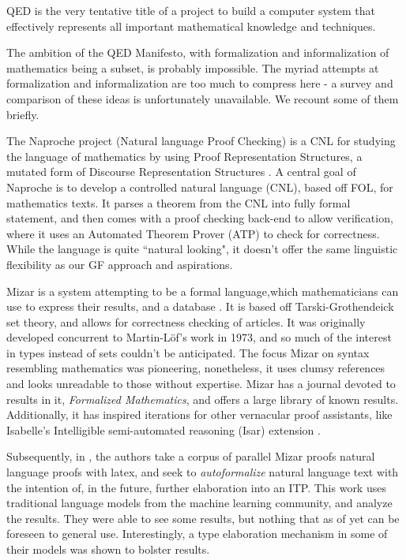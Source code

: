 \begin{displayquote}
QED is the very tentative title of a project to build a computer system that effectively represents all important mathematical knowledge and techniques.
\cite{godel1994qed} 
\end{displayquote}

The ambition of the QED Manifesto, with formalization and informalization of
mathematics being a subset, is probably impossible. The myriad attempts
at formalization and informalization are too much to compress here - a survey
and comparison of these ideas is unfortunately unavailable. We recount some of
them briefly.

The Naproche project (Natural language Proof Checking) is a CNL for studying the
language of mathematics by using Proof Representation Structures, a mutated form
of Discourse Representation Structures \cite{cramer2009naproche}. A central
goal of Naproche is to develop a controlled natural language (CNL), based off FOL, for
mathematics texts. It parses a theorem from the CNL into fully formal
statement, and then comes with a proof checking back-end to allow verification,
where it uses an Automated Theorem Prover (ATP) to check for correctness.
While the language is quite ``natural looking", it doesn't offer the same
linguistic flexibility as our GF approach and aspirations.

Mizar is a system attempting to be a formal language,which mathematicians can
use to express their results, and a database \cite{rudnicki1992overview}. It is
based off Tarski-Grothendeick set theory, and allows for correctness checking of
articles. It was originally developed concurrent to Martin-Löf's work in 1973,
and so much of the interest in types instead of sets couldn't be anticipated.
The focus Mizar on syntax resembling mathematics was pioneering, nonetheless, it
uses clumsy references and looks unreadable to those without expertise. Mizar
has a journal devoted to results in it, \emph{Formalized Mathematics}, and
offers a large library of known results. Additionally, it has inspired
iterations for other vernacular proof assistants, like Isabelle's Intelligible semi-automated
reasoning (Isar) extension \cite{wenzel2004isabelle}.

Subsequently, in \cite{mlTrans}, the authors take a corpus of parallel Mizar proofs natural
language proofs with latex, and seek to \emph{autoformalize} natural language
text with the intention of, in the future, further elaboration into an ITP.
This work uses traditional language models from the machine learning community, and analyze
the results. They were able to see some results, but nothing that as of yet can
be foreseen to general use.  Interestingly, a type elaboration mechanism in some
of their models was shown to bolster results.

